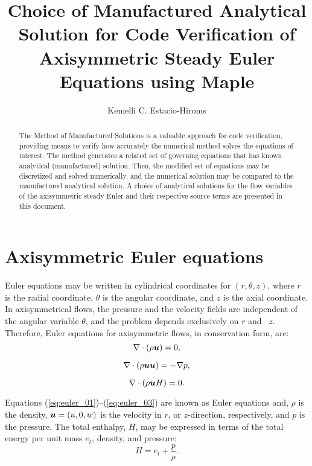 \documentclass[10pt]{article}
\title{Choice of Manufactured Analytical Solution for Code Verification of Axisymmetric Steady Euler Equations using Maple}
\author{Kemelli C. Estacio-Hiroms}
\newcommand{\bv}[1]{\ensuremath{\mbox{\boldmath$ #1 $}}}
\begin{document}
 
\maketitle

\begin{abstract}
The Method of Manufactured Solutions is a valuable approach for code verification, providing means to verify how accurately the numerical method solves the equations of interest. The method generates a related set of governing equations that has known analytical (manufactured) solution. Then, the modified set of equations may be discretized and solved numerically, and the numerical solution may be compared to the manufactured analytical solution. A choice of analytical solutions for the flow variables of the axisymmetric steady Euler and their respective source terms are presented in this document.
\end{abstract}

\section{Axisymmetric Euler equations}

Euler equations may be written in cylindrical coordinates for $(r,\theta,z)$, where $r$ is the radial coordinate, $\theta$ is the angular coordinate, and $z$ is the axial coordinate. In axisymmetrical flows, the pressure and the velocity fields are independent of the angular variable $\theta$, and the problem depends exclusively on $r$ and~ $z$. Therefore, Euler equations for axisymmetric flows, in conservation form,  are:
\begin{equation}
 \label{eq:euler_01}
\nabla \cdot \left(\rho \bv{u}\right) = 0,
\end{equation}

\begin{equation}
 \label{eq:euler_02}
\nabla\cdot\left(\rho\bv{u}\bv{u}\right) = -\nabla p,
\end{equation}

\begin{equation}
 \label{eq:euler_03}
\nabla\cdot\left(\rho \bv{u} H\right) = 0.
\end{equation}
%


Equations (\ref{eq:euler_01})--(\ref{eq:euler_03}) are known as Euler equations and, $\rho$ is the density, $\bv{u}=(u,0,w)$ is the velocity in $r$, or $z$-direction, respectively,    and $p$ is the pressure. The total enthalpy, $H$, may be expressed in terms of the total energy per unit mass $e_t$, density, and pressure:
$$H = e_t + \dfrac{p}{\rho}.$$
\end{document}

